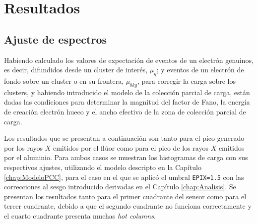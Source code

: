 \chapter{Resultados \label{chap:Resultados}}
\section{Ajuste de espectros}
\noindent Habiendo calculado los valores de expectación de eventos de un electrón genuinos, es decir, difundidos desde un cluster de interés, $\mu_{g}$; y eventos de un electrón de fondo sobre un cluster o en su frontera, $\mu_{bkg}$, para corregir la carga sobre los clusters, y habiendo introducido el modelo de la colección parcial de carga, están dadas las condiciones para determinar la magnitud del factor de Fano, la energía de creación electrón hueco y el ancho efectivo de la zona de colección parcial de carga.

Los resultados que se presentan a continuación son tanto para el pico generado por los rayos $X$ emitidos por el flúor como para el pico de los rayos $X$ emitidos por el aluminio. Para ambos casos se muestran los histogramas de carga con sus respectivos ajustes, utilizando el modelo descripto en la Capítulo \ref{chap:ModeloPCC}, para el caso en el que se aplicó el umbral \verb|EPIX=1.5| con las correcciones al sesgo introducido derivadas en el Capítulo \ref{chap:Analisis}. 
Se presentan los resultados tanto para el primer cuadrante del sensor como para el tercer cuadrante, debido a que el segundo cuadrante no funciona correctamente y el cuarto cuadrante presenta muchas \textit{hot columns}.

